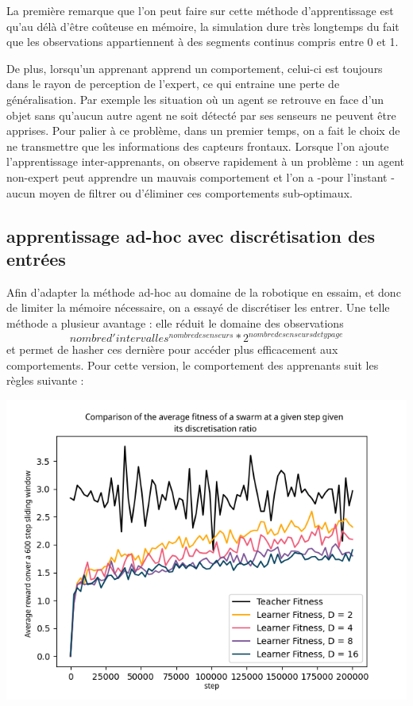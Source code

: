 \documentclass[a4paper, 12pt]{report}
\begin{document}
	La première remarque que l'on peut faire sur cette méthode d'apprentissage est qu'au délà d'être coûteuse en mémoire, la simulation dure très longtemps du fait que les observations appartiennent à des segments continus compris entre 0 et 1.
	
	De plus, lorsqu'un apprenant apprend un comportement, celui-ci est toujours dans le rayon de perception de l'expert, ce qui entraine une perte de généralisation. Par exemple les situation où un agent se retrouve en face d'un objet sans qu'aucun autre agent ne soit détecté par ses senseurs ne peuvent être apprises.
	Pour palier à ce problème, dans un premier temps, on a fait le choix de ne transmettre que les informations des capteurs frontaux.
	Lorsque l'on ajoute l'apprentissage inter-apprenants, on observe rapidement à un problème : un agent non-expert peut apprendre un mauvais comportement et l'on a -pour l'instant - aucun moyen de filtrer ou d'éliminer ces comportements sub-optimaux.
	
	\subsection{apprentissage ad-hoc avec discrétisation des entrées}
	Afin d'adapter la méthode ad-hoc au domaine de la robotique en essaim, et donc de limiter la mémoire nécessaire, on a essayé de discrétiser les entrer. Une telle méthode a plusieur avantage : elle réduit le domaine des observations $$nombre d'intervalles^{nombre de senseurs}*2^{nombre de senseurs de typage} $$ et permet de hasher ces dernière pour accéder plus efficacement aux comportements.
	Pour cette version, le comportement des apprenants suit les règles suivante :
	
	
	
\includegraphics{averageComparisons}
\end{document}
